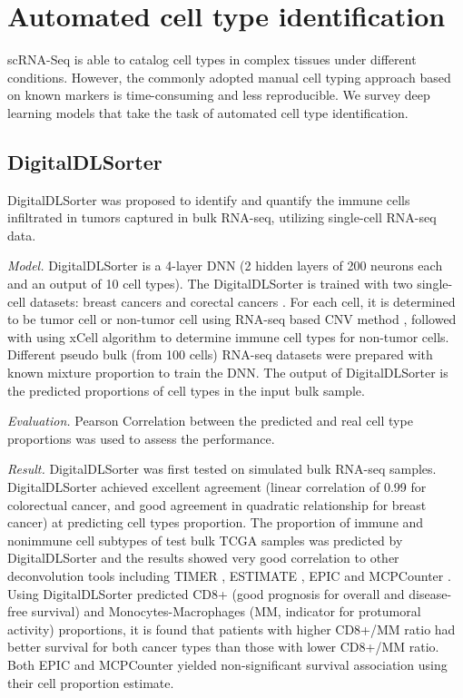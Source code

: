 \documentclass[
]{book}
\begin{document}
\hypertarget{ch-5-6}{%
\section{Automated cell type identification}\label{ch-5-6}}

scRNA-Seq is able to catalog cell types in complex tissues under different conditions. However, the commonly adopted manual cell typing approach based on known markers is time-consuming and less reproducible. We survey deep learning models that take the task of automated cell type identification.

\hypertarget{ch-5-6-1}{%
\subsection{DigitalDLSorter}\label{ch-5-6-1}}

DigitalDLSorter \citep{RN156} was proposed to identify and quantify the immune cells infiltrated in tumors captured in bulk RNA-seq, utilizing single-cell RNA-seq data.

\emph{Model.} DigitalDLSorter is a 4-layer DNN (2 hidden layers of 200 neurons each and an output of 10 cell types). The DigitalDLSorter is trained with two single-cell datasets: breast cancers \citep{RN220} and corectal cancers \citep{RN221}. For each cell, it is determined to be tumor cell or non-tumor cell using RNA-seq based CNV method \citep{RN220}, followed with using xCell algorithm \citep{RN249} to determine immune cell types for non-tumor cells. Different pseudo bulk (from 100 cells) RNA-seq datasets were prepared with known mixture proportion to train the DNN. The output of DigitalDLSorter is the predicted proportions of cell types in the input bulk sample.

\emph{Evaluation.} Pearson Correlation between the predicted and real cell type proportions was used to assess the performance.

\emph{Result.} DigitalDLSorter was first tested on simulated bulk RNA-seq samples. DigitalDLSorter achieved excellent agreement (linear correlation of 0.99 for colorectual cancer, and good agreement in quadratic relationship for breast cancer) at predicting cell types proportion. The proportion of immune and nonimmune cell subtypes of test bulk TCGA samples was predicted by DigitalDLSorter and the results showed very good correlation to other deconvolution tools including TIMER \citep{RN220}, ESTIMATE \citep{RN248}, EPIC \citep{RN245} and MCPCounter \citep{RN247}. Using DigitalDLSorter predicted CD8+ (good prognosis for overall and disease-free survival) and Monocytes-Macrophages (MM, indicator for protumoral activity) proportions, it is found that patients with higher CD8+/MM ratio had better survival for both cancer types than those with lower CD8+/MM ratio. Both EPIC and MCPCounter yielded non-significant survival association using their cell proportion estimate.
\end{document}
